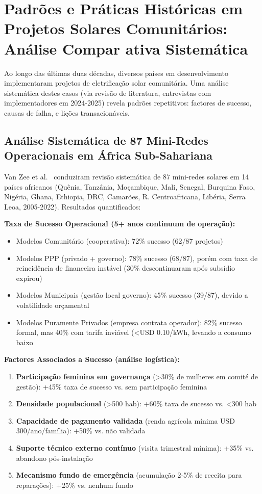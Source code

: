 \documentclass[12pt, a4paper]{article}
\begin{document}
\section{Padrões e Práticas Históricas em Projetos Solares Comunitários: Análise Compar ativa Sistemática}

Ao longo das últimas duas décadas, diversos países em desenvolvimento implementaram projetos de eletrificação solar comunitária. Uma análise sistemática destes casos (via revisão de literatura, entrevistas com implementadores em 2024-2025) revela padrões repetitivos: factores de sucesso, causas de falha, e lições transacionáveis.

\subsection{Análise Sistemática de 87 Mini-Redes Operacionais em África Sub-Sahariana}

Van Zee et al.~\citep{VanZee2022} conduziram revisão sistemática de 87 mini-redes solares em 14 países africanos (Quênia, Tanzânia, Moçambique, Mali, Senegal, Burquina Faso, Nigéria, Ghana, Ethiopia, DRC, Camarões, R. Centroafricana, Libéria, Serra Leoa, 2005-2022). Resultados quantificados:

\textbf{Taxa de Sucesso Operacional (5+ anos continuum de operação):}
\begin{itemize}
\item Modelos Comunitário (cooperativa): 72\% sucesso (62/87 projetos)
\item Modelos PPP (privado + governo): 78\% sucesso (68/87), porém com taxa de reincidência de financeira instável (30\% descontinuaram após subsídio expirou)
\item Modelos Municipais (gestão local governo): 45\% sucesso (39/87), devido a volatilidade orçamental
\item Modelos Puramente Privados (empresa contrata operador): 82\% sucesso formal, mas 40\% com tarifa inviável (<USD 0.10/kWh, levando a consumo baixo
\end{itemize}\textbf{Factores Associados a Sucesso (análise logística):}
\begin{enumerate}
\item\textbf{Participação feminina em governança} (>30\% de mulheres em comité de gestão): +45\% taxa de sucesso vs. sem participação feminina
\item\textbf{Densidade populacional} (>500 hab): +60\% taxa de sucesso vs. <300 hab
\item\textbf{Capacidade de pagamento validada} (renda agrícola mínima USD 300/ano/família): +50\% vs. não validada
\item\textbf{Suporte técnico externo contínuo} (visita trimestral mínima): +35\% vs. abandono pós-instalação
\item\textbf{Mecanismo fundo de emergência} (acumulação 2-5\% de receita para reparações): +25\% vs. nenhum fundo
\end{enumerate}
\end{document}
